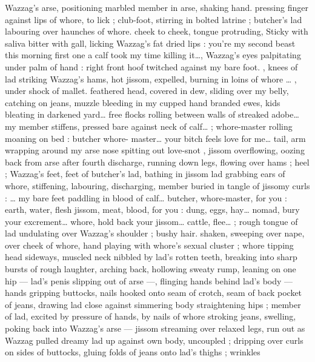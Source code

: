 Wazzag's arse, positioning marbled member in arse, shaking hand. 
pressing finger against lips of whore, to lick ; club-foot, stirring in 
bolted latrine ; butcher's lad labouring over haunches of whore. 
cheek to cheek, tongue protruding, Sticky with saliva bitter with gall, 
licking Wazzag's fat dried lips : {\gl}{\td} you're my second beast this 
morning{\td} first one a calf{\td} took my time killing it{\ldots}{\gr}, Wazzag's eyes 
palpitating under palm of hand : {\gl}{\td} right front hoof twitched against 
my bare foot. {\gr}, knees of lad striking Wazzag's hams, hot jissom, 
expelled, burning in loins of whore {\ldots} {\gl}, under shock of mallet. 
feathered head, covered in dew, sliding over my belly, catching on 
jeans, muzzle bleeding in my cupped hand{\td} branded ewes, kids 
bleating in darkened yard{\ldots} free flocks rolling between walls of 
streaked adobe{\ldots} my member stiffens, pressed bare against neck of 
calf{\ldots}{\gr} ; whore-master rolling moaning on bed : {\gl} butcher{\td} whore- 
master{\ldots} your bitch feels love for me{\ldots} tail, arm wrapping around my 
arse{\td} nose spitting out love-snot{\td} {\gr}, jissom overflowing, oozing back 
from arse after fourth discharge, running down legs, flowing over 
hams ; heel ; Wazzag's feet, feet of butcher's lad, bathing in jissom 
lad grabbing ears of whore, stiffening, labouring, discharging, 
member buried in tangle of jissomy curls : {\gl}{\ldots} my bare feet paddling 
in blood of calf{\ldots} butcher, whore-master, for you : earth, water, flesh 
jissom, meat, blood, for you : dung, eggs, hay{\ldots} nomad, bury your 
excrement{\ldots} whore, hold back your jissom{\ldots} cattle, flee{\ldots} {\gr} ; rough 
tongue of lad undulating over Wazzag's shoulder ; bushy hair. 
shaken, sweeping over nape, over cheek of whore, hand playing with 
whore's sexual cluster ; whore tipping head sideways, muscled neck 
nibbled by lad's rotten teeth, breaking into sharp bursts of rough 
laughter, arching back, hollowing sweaty rump, leaning on one hip --- 
lad's penis slipping out of arse ---, flinging hands behind lad's body 
--- hands gripping buttocks, nails hooked onto seam of crotch, seam 
of back pocket of jeans, drawing lad close against simmering body 
straightening hips ; member of lad, excited by pressure of hands, by 
nails of whore stroking jeans, swelling, poking back into Wazzag's 
arse --- jissom streaming over relaxed legs, run out as Wazzag pulled 
dreamy lad up against own body, uncoupled ; dripping over curls on 
sides of buttocks, gluing folds of jeans onto lad's thighs ; wrinkles 
